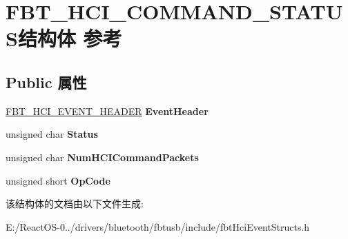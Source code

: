 \hypertarget{struct_f_b_t___h_c_i___c_o_m_m_a_n_d___s_t_a_t_u_s}{}\section{F\+B\+T\+\_\+\+H\+C\+I\+\_\+\+C\+O\+M\+M\+A\+N\+D\+\_\+\+S\+T\+A\+T\+U\+S结构体 参考}
\label{struct_f_b_t___h_c_i___c_o_m_m_a_n_d___s_t_a_t_u_s}
\subsection*{Public 属性}
\begin{DoxyCompactItemize}
\item 
\mbox{\label{struct_f_b_t___h_c_i___c_o_m_m_a_n_d___s_t_a_t_u_s_a500efc295d4e1c4dbc1a568c23e98e1a}} 
\hyperlink{struct_f_b_t___h_c_i___e_v_e_n_t___h_e_a_d_e_r}{F\+B\+T\+\_\+\+H\+C\+I\+\_\+\+E\+V\+E\+N\+T\+\_\+\+H\+E\+A\+D\+ER} {\bfseries Event\+Header}
\item 
\mbox{\label{struct_f_b_t___h_c_i___c_o_m_m_a_n_d___s_t_a_t_u_s_ac5e970f1bd9aeab76951ef2fb633090b}} 
unsigned char {\bfseries Status}
\item 
\mbox{\label{struct_f_b_t___h_c_i___c_o_m_m_a_n_d___s_t_a_t_u_s_ae2be1dcb9e2caebd29af4defe47a55f4}} 
unsigned char {\bfseries Num\+H\+C\+I\+Command\+Packets}
\item 
\mbox{\label{struct_f_b_t___h_c_i___c_o_m_m_a_n_d___s_t_a_t_u_s_a1eede8569bbfa03ba8c81976c459cc79}} 
unsigned short {\bfseries Op\+Code}
\end{DoxyCompactItemize}


该结构体的文档由以下文件生成\+:\begin{DoxyCompactItemize}
\item 
E\+:/\+React\+O\+S-\/0../drivers/bluetooth/fbtusb/include/fbt\+Hci\+Event\+Structs.\+h\end{DoxyCompactItemize}
